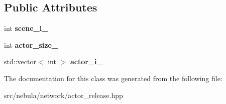 \subsection*{\-Public \-Attributes}
\begin{DoxyCompactItemize}
\item 
\hypertarget{classneb_1_1packet_1_1actor__release_a93c67e65fd2391fa5788ea4df62dea83}{int {\bfseries scene\-\_\-i\-\_\-}}\label{classneb_1_1packet_1_1actor__release_a93c67e65fd2391fa5788ea4df62dea83}

\item 
\hypertarget{classneb_1_1packet_1_1actor__release_adb41a9a1ca585fc92c5811a086088fba}{int {\bfseries actor\-\_\-size\-\_\-}}\label{classneb_1_1packet_1_1actor__release_adb41a9a1ca585fc92c5811a086088fba}

\item 
\hypertarget{classneb_1_1packet_1_1actor__release_a38a61811df9631de91ded02972d2e23b}{std\-::vector$<$ int $>$ {\bfseries actor\-\_\-i\-\_\-}}\label{classneb_1_1packet_1_1actor__release_a38a61811df9631de91ded02972d2e23b}

\end{DoxyCompactItemize}


\-The documentation for this class was generated from the following file\-:\begin{DoxyCompactItemize}
\item 
src/nebula/network/actor\-\_\-release.\-hpp\end{DoxyCompactItemize}
